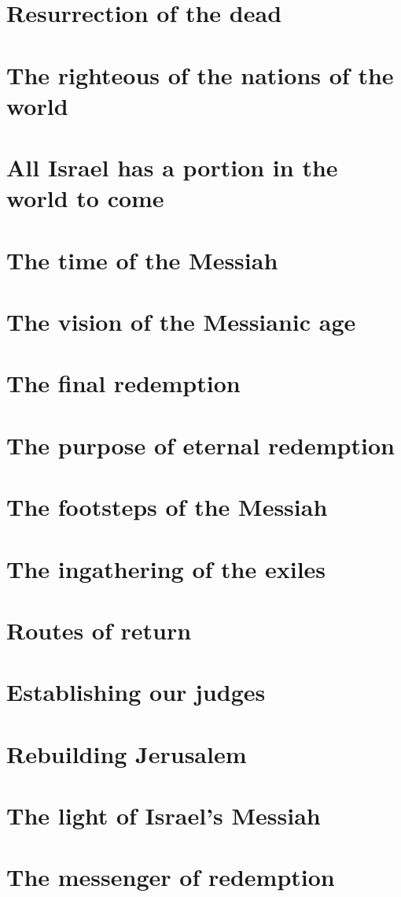 \documentclass[11pt, a5paper, twoside, chapterprefix, openany]{scrbook}
\begin{document}
\chapter{Resurrection of the dead}
\chapter{The righteous of the nations of the world}
\chapter{All Israel has a portion in the world to come}
\chapter{The time of the Messiah}
\chapter{The vision of the Messianic age}
\chapter{The final redemption}
\chapter{The purpose of eternal redemption}
\chapter{The footsteps of the Messiah}
\chapter{The ingathering of the exiles}
\chapter{Routes of return}
\chapter{Establishing our judges}
\chapter{Rebuilding Jerusalem}
\chapter{The light of Israel’s Messiah}
\chapter{The messenger of redemption}
\end{document}
